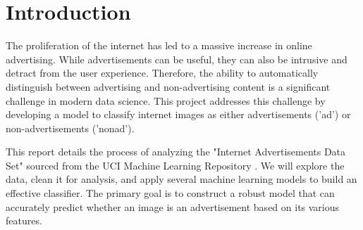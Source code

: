 \section{Introduction}
\label{sec:introduction}

The proliferation of the internet has led to a massive increase in online advertising. While advertisements can be useful, they can also be intrusive and detract from the user experience. Therefore, the ability to automatically distinguish between advertising and non-advertising content is a significant challenge in modern data science. This project addresses this challenge by developing a model to classify internet images as either advertisements ('ad') or non-advertisements ('nonad').

This report details the process of analyzing the "Internet Advertisements Data Set" sourced from the UCI Machine Learning Repository \cite{lichman2013uci}. We will explore the data, clean it for analysis, and apply several machine learning models to build an effective classifier. The primary goal is to construct a robust model that can accurately predict whether an image is an advertisement based on its various features.